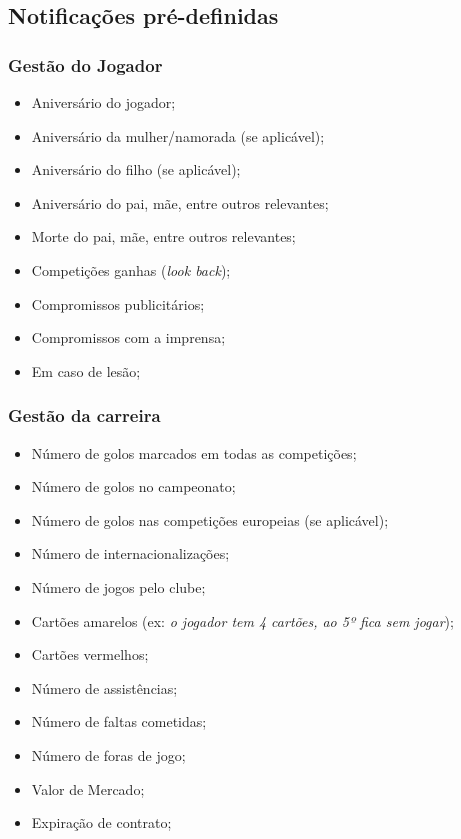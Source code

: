 \subsection{Notificações pré-definidas}

\subsubsection{Gestão do Jogador}
\begin{itemize}
    \item Aniversário do jogador;
    \item Aniversário da mulher/namorada (se aplicável);
    \item Aniversário do filho (se aplicável);
    \item Aniversário do pai, mãe, entre outros relevantes;
    \item Morte do pai, mãe, entre outros relevantes;
    \item Competições ganhas (\emph{look back});
    \item Compromissos publicitários;
    \item Compromissos com a imprensa;
    \item Em caso de lesão;
\end{itemize}

\subsubsection{Gestão da carreira}

\begin{itemize}
    \item Número de golos marcados em todas as competições;
    \item Número de golos no campeonato;
    \item Número de golos nas competições europeias (se aplicável);
    \item Número de internacionalizações;
    \item Número de jogos pelo clube;
    \item Cartões amarelos (ex: \emph{o jogador tem 4 cartões, ao 5º fica sem jogar});
    \item Cartões vermelhos;
    \item Número de assistências;
    \item Número de faltas cometidas;
    \item Número de foras de jogo;
    \item Valor de Mercado;
    \item Expiração de contrato;
\end{itemize}

